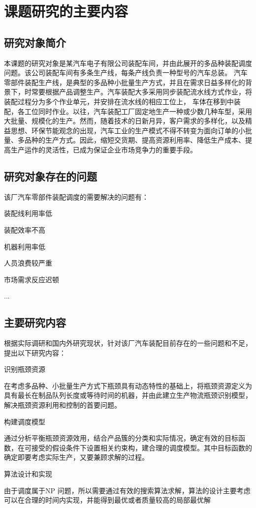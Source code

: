 \chapter{课题研究的主要内容}
\section{研究对象简介}
本课题的研究对象是某汽车电子有限公司装配车间，并由此展开的多品种装配调度问题。该公司装配车间有多条生产线，每条产线负责一种型号的汽车总装。
汽车零部件装配生产线，是典型的多品种小批量生产方式，并且在需求日益多样化的背景下，时常要根据产品调整生产。汽车装配大多采用同步装配流水线方式作业，将装配过程分为多个作业单元，并安排在流水线的相应工位上，
车体在移到中装配，各工位同时作业。以往，汽车装配工厂固定地生产一种或少数几种车型，采用大批量、规模化的生产。然而，随着技术的日新月异，客户需求的多样化，以及精益思想、环保节能观念的出现，汽车工业的生产模式不得不转变为面向订单的小批量、多品种的生产方式。因此，缩短交货期、提高资源利用率、降低生产成本、提高生产运作的灵活性，已成为保证企业市场竞争力的重要手段。

\section{研究对象存在的问题}
该厂汽车零部件装配调度的需要解决的问题有：
\begin{asparaenum}[(1)]
\item 装配线利用率低
\item 装配效率不高
\item 机器利用率低
\item 人员浪费较严重
\item 市场需求反应迟顿
\item ...
\end{asparaenum}

\section{主要研究内容}
根据实际调研和国内外研究现状，针对该厂汽车装配目前存在的一些问题和不足，提出以下研究内容：
\renewcommand{\labelenumi}{(\theenumi)}
\begin{asparaenum}
\item 识别瓶颈资源

在考虑多品种、小批量生产方式下瓶颈具有动态特性的基础上，将瓶颈资源定义为具有最长在制品队列长度或等待时间的机器，并由此建立生产物流瓶颈识别模型，解决瓶颈资源利用和控制的首要问题。
\item 构建调度模型

通过分析平衡瓶颈资源效用，结合产品簇的分类和实际情况，确定有效的目标函数，在可接受的假设条件下设置相关约束构，建合理的调度模型。其中目标函数的确定即要考虑实际生产，又要兼顾求解的过程。
\item 算法设计和实现
\end{asparaenum}

由于调度属于NP 问题，所以需要通过有效的搜索算法求解，算法的设计主要考虑可以在合理的时间内实现，并能得到最优或者质量较高的局部最优解
